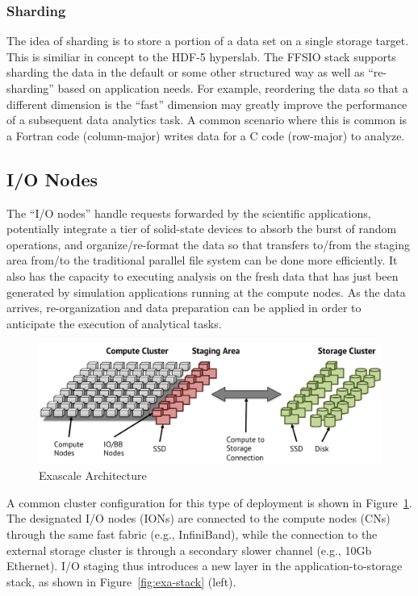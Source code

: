\documentclass[conference]{IEEEtran}
\begin{document}
\subsubsection{Sharding}
\label{sec:sharding}

The idea of sharding is to store a portion of a data set on a single storage
target. This is similiar in concept to the HDF-5 hyperslab. The FFSIO stack
supports sharding the data in the default or some other structured way as well
as ``re-sharding'' based on application needs. For example, reordering the
data so that a different dimension is the ``fast'' dimension may greatly
improve the performance of a subsequent data analytics task. A common scenario
where this is common is a Fortran code (column-major) writes data for a C code
(row-major) to analyze.

\subsection{I/O Nodes}
The ``I/O nodes'' handle requests forwarded by the scientific applications,
potentially integrate a tier of solid-state devices to absorb the burst of
random operations, and organize/re-format the data so that transfers to/from
the staging area from/to the traditional parallel file system can be done more
efficiently. It also has the capacity to executing analysis on the fresh data
that has just been generated by simulation applications running at the compute
nodes. As the data arrives, re-organization and data preparation can be applied
in order to anticipate the execution of analytical tasks.

\begin{figure}[htbp]
\centering
\includegraphics[scale=0.30]{images/exa-arch.png}
\caption{Exascale Architecture}
\label{fig:exa-arch}
\end{figure}

A common cluster configuration for this type of deployment is shown in
Figure~\ref{fig:exa-arch}. The designated I/O nodes (IONs) are connected to the
compute nodes (CNs) through the same fast fabric (e.g., InfiniBand), while the
connection to the external storage cluster is through a secondary slower
channel (e.g., 10Gb Ethernet). I/O staging thus introduces a new layer in the
application-to-storage stack, as shown in Figure~\ref{fig:exa-stack} (left).
\end{document}
